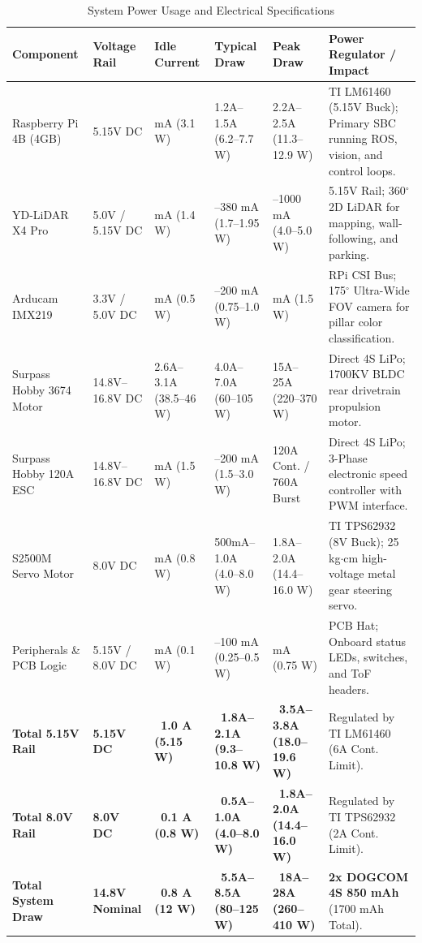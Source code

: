 \documentclass[12pt,a4paper]{article}
\begin{document}
\begin{table}[htbp]
\centering
\small
\caption{System Power Usage and Electrical Specifications}
\label{tab:power_usage}
\begin{tabularx}{\textwidth}{>{\raggedright\arraybackslash}X >{\raggedright\arraybackslash}p{2.2cm} >{\raggedright\arraybackslash}p{1.8cm} >{\raggedright\arraybackslash}p{2.2cm} >{\raggedright\arraybackslash}p{2.2cm} >{\raggedright\arraybackslash}X}
\toprule
\textbf{Component} & \textbf{Voltage Rail} & \textbf{Idle Current} & \textbf{Typical Draw} & \textbf{Peak Draw} & \textbf{Power Regulator / Impact} \\
\midrule
Raspberry Pi 4B (4GB) & 5.15V DC & 600 mA (3.1 W) & 1.2A--1.5A (6.2--7.7 W) & 2.2A--2.5A (11.3--12.9 W) & TI LM61460 (5.15V Buck); Primary SBC running ROS, vision, and control loops. \\
YD-LiDAR X4 Pro & 5.0V / 5.15V DC & 280 mA (1.4 W) & 330--380 mA (1.7--1.95 W) & 800--1000 mA (4.0--5.0 W) & 5.15V Rail; 360$^\circ$ 2D LiDAR for mapping, wall-following, and parking. \\
Arducam IMX219 & 3.3V / 5.0V DC & 100 mA (0.5 W) & 150--200 mA (0.75--1.0 W) & 300 mA (1.5 W) & RPi CSI Bus; 175$^\circ$ Ultra-Wide FOV camera for pillar color classification. \\
Surpass Hobby 3674 Motor & 14.8V--16.8V DC & 2.6A--3.1A (38.5--46 W) & 4.0A--7.0A (60--105 W) & 15A--25A (220--370 W) & Direct 4S LiPo; 1700KV BLDC rear drivetrain propulsion motor. \\
Surpass Hobby 120A ESC & 14.8V--16.8V DC & 100 mA (1.5 W) & 100--200 mA (1.5--3.0 W) & 120A Cont. / 760A Burst & Direct 4S LiPo; 3-Phase electronic speed controller with PWM interface. \\
S2500M Servo Motor & 8.0V DC & 100 mA (0.8 W) & 500mA--1.0A (4.0--8.0 W) & 1.8A--2.0A (14.4--16.0 W) & TI TPS62932 (8V Buck); 25 kg$\cdot$cm high-voltage metal gear steering servo. \\
Peripherals \& PCB Logic & 5.15V / 8.0V DC & 20 mA (0.1 W) & 50--100 mA (0.25--0.5 W) & 150 mA (0.75 W) & PCB Hat; Onboard status LEDs, switches, and ToF headers. \\
\midrule
\textbf{Total 5.15V Rail} & \textbf{5.15V DC} & \textbf{~1.0 A (5.15 W)} & \textbf{~1.8A--2.1A (9.3--10.8 W)} & \textbf{~3.5A--3.8A (18.0--19.6 W)} & Regulated by TI LM61460 (6A Cont. Limit). \\
\textbf{Total 8.0V Rail} & \textbf{8.0V DC} & \textbf{~0.1 A (0.8 W)} & \textbf{~0.5A--1.0A (4.0--8.0 W)} & \textbf{~1.8A--2.0A (14.4--16.0 W)} & Regulated by TI TPS62932 (2A Cont. Limit). \\
\textbf{Total System Draw} & \textbf{14.8V Nominal} & \textbf{~0.8 A (12 W)} & \textbf{~5.5A--8.5A (80--125 W)} & \textbf{~18A--28A (260--410 W)} & \textbf{2x DOGCOM 4S 850 mAh} (1700 mAh Total). \\
\bottomrule
\end{tabularx}
\end{table}
\end{document}
